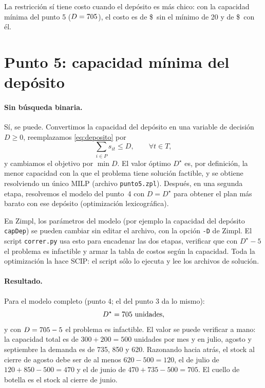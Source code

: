 \documentclass[11pt,a4paper]{article}
\begin{document}
\begin{center}
\small
\tablaTercCuatro
\end{center}

La restricción sí tiene costo cuando el depósito es más chico: con la
capacidad mínima del punto 5 ($D=705$), el costo es de
\$\,\costoDmintres{} sin el mínimo de 20 y de \$\,\costoDmincuatro{} con él.

\section*{Punto 5: capacidad mínima del depósito}

\paragraph{Sin búsqueda binaria.} Sí, se puede. Convertimos la capacidad del
depósito en una variable de decisión $D \ge 0$, reemplazamos
\eqref{eq:deposito} por
\[
  \sum_{i \in P} s_{it} \le D, \qquad \forall t \in T,
\]
y cambiamos el objetivo por $\min D$. El valor óptimo $D^{\star}$ es, por
definición, la menor capacidad con la que el problema tiene solución factible,
y se obtiene resolviendo un único MILP (archivo \texttt{punto5.zpl}). Después,
en una segunda etapa, resolvemos el modelo del punto~4 con $D = D^{\star}$ para
obtener el plan más barato con ese depósito (optimización lexicográfica).

En Zimpl, los parámetros del modelo (por ejemplo la capacidad del depósito
\texttt{capDep}) se pueden cambiar sin editar el archivo, con la opción
\texttt{-D} de Zimpl. El script \texttt{correr.py} usa esto para encadenar las
dos etapas, verificar que con $D^{\star}-5$ el problema es infactible y armar
la tabla de costos según la capacidad. Toda la optimización la hace SCIP: el
script sólo lo ejecuta y lee los archivos de solución.

\paragraph{Resultado.} Para el modelo completo (punto 4; el del punto 3 da lo
mismo):
\[
  D^{\star} = 705 \text{ unidades},
\]
y con $D = 705 - 5$ el problema es infactible. El valor se puede
verificar a mano: la capacidad total es de $300 + 200 = 500$ unidades por mes y
en julio, agosto y septiembre la demanda es de 735, 850 y 620. Razonando hacia
atrás, el stock al cierre de agosto debe ser de al menos $620-500 = 120$, el de
julio de $120 + 850 - 500 = 470$ y el de junio de $470 + 735 - 500 = 705$. El
cuello de botella es el stock al cierre de junio.
\end{document}
